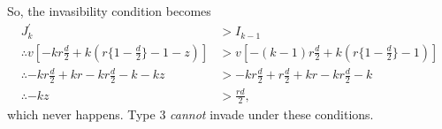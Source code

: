\documentclass[14pt, a4paper, justified]{article}
\begin{document}
So, the invasibility condition becomes
\begin{equation}
    \begin{split}
        J^\prime_k & > I_{k-1} \\
        \therefore v[-kr\frac{d}{2} + k(r\{1-\frac{d}{2}\} - 1 - z)] & > v[-(k-1)r\frac{d}{2} + k(r\{1 - \frac{d}{2}\} - 1)]
        \\
        \therefore -kr\frac{d}{2} + kr - kr\frac{d}{2} - k - kz & > -kr\frac{d}{2} + r\frac{d}{2} + kr - kr\frac{d}{2} - k \\
        \therefore - kz & > \frac{rd}{2},
    \end{split}
\end{equation}
which never happens.
Type $3$ \emph{cannot} invade under these conditions.



\end{document}
